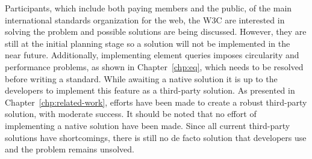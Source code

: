 \documentclass[a4paper,11pt]{kth-mag}
\begin{document}
      Participants, which include both paying members and the public, of the main international standards organization for the \gls{web}, the \gls{W3C} are interested in solving the problem and possible solutions are being discussed.
      However, they are still at the initial planning stage \cite{ricg_site} so a solution will not be implemented  in the near future.
      Additionally, implementing element queries imposes circularity and performance problems, as shown in Chapter~\ref{chp:eq}, which needs to be resolved before writing a standard.
      While awaiting a \gls{native} solution it is up to the developers to implement this feature as a \gls{third-party} solution.
      As presented in Chapter~\ref{chp:related-work}, efforts have been made to create a robust \gls{third-party} solution, with moderate success.
      It should be noted that no effort of implementing a native solution have been made.
      Since all current \gls{third-party} solutions have shortcomings, there is still no de facto solution that developers use and the problem remains unsolved.
\end{document}
